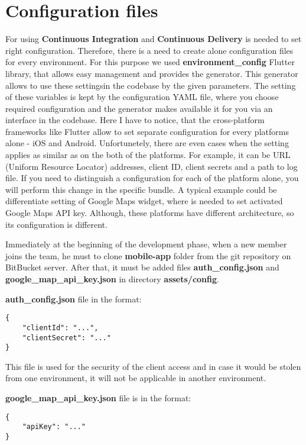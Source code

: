 \section{Configuration files}\label{sec:configuration-files}

For using \textbf{Continuous Integration} and \textbf{Continuous Delivery} is needed to set right configuration.
Therefore, there is a need to create alone configuration files for every environment.
For this purpose we used \textbf{environment\_config} Flutter library, that allows easy management and provides the generator.
This generator allows to use these settingsin the codebase by the given parameters.
The setting of these variables is kept by the configuration YAML file, where you choose required configuration and the generator makes available it for you via an interface in the codebase.
Here I have to notice, that the cross-platform frameworks like Flutter allow to set separate configuration for every platforms alone - iOS and Android.
Unfortunetely, there are even cases when the setting applies as similar as on the both of the platforms.
For example, it can be URL (Uniform Resource Locator) addresses, client ID, client secrets and a path to log file.
If you need to distinguish a configuration for each of the platform alone, you will perform this change in the specific bundle.
A typical example could be differentiate setting of Google Maps widget, where is needed to set activated Google Maps API key.
Although, these platforms have different architecture, so its configuration is different.

Immediately at the beginning of the development phase, when a new member joins the team, he must to clone \textbf{mobile-app} folder from the git repository on BitBucket server.
After that, it must be added files \textbf{auth\_config.json} and \textbf{google\_map\_api\_key.json} in directory \textbf{assets/config}.

\textbf{auth\_config.json} file in the format:
\begin{verbatim}
{
    "clientId": "...",
    "clientSecret": "..."
}
\end{verbatim}


This file is used for the security of the client access and in case it would be stolen from one environment, it will not be applicable in another environment.

\textbf{google\_map\_api\_key.json} file is in the format:
\begin{verbatim}
{
    "apiKey": "..."
}
\end{verbatim}

